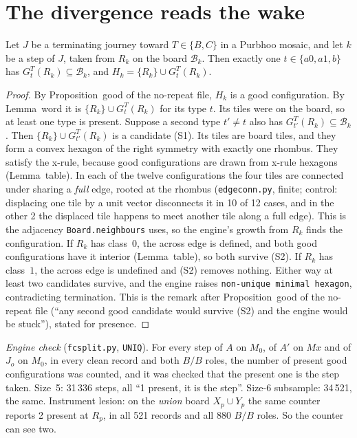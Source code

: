 \documentclass[11pt]{article}
\theoremstyle{definition}\newtheorem{definition}[theorem]{Definition}\newtheorem{remark}[theorem]{Remark}
\begin{document}
\section{The divergence reads the wake}\label{sec:fc}
\begin{lemma}\label{lem:U}
Let $J$ be a terminating journey toward $T\in\{B,C\}$ in a Purbhoo mosaic, and let $k$ be a step of $J$, taken from $R_k$ on the board $\mathcal B_k$. Then exactly one $t\in\{a0,a1,b\}$ has $G^T_t(R_k)\subseteq\mathcal B_k$, and $H_k=\{R_k\}\cup G^T_t(R_k)$.
\end{lemma}
\begin{proof}
By Proposition~good of the no-repeat file, $H_k$ is a good configuration. By Lemma~word it is $\{R_k\}\cup G^T_t(R_k)$ for its type $t$. Its tiles were on the board, so at least one type is present.
Suppose a second type $t'\ne t$ also has $G^T_{t'}(R_k)\subseteq\mathcal B_k$. Then $\{R_k\}\cup G^T_{t'}(R_k)$ is a candidate (S1). Its tiles are board tiles, and they form a convex hexagon of the right symmetry with exactly one rhombus. They satisfy the x-rule, because good configurations are drawn from x-rule hexagons (Lemma~table). In each of the twelve configurations the four tiles are connected under sharing a \emph{full} edge, rooted at the rhombus (\texttt{edgeconn.py}, finite; control: displacing one tile by a unit vector disconnects it in 10 of 12 cases, and in the other 2 the displaced tile happens to meet another tile along a full edge). This is the adjacency \texttt{Board.neighbours} uses, so the engine's growth from $R_k$ finds the configuration.
If $R_k$ has class~$0$, the across edge is defined, and both good configurations have it interior (Lemma~table), so both survive (S2). If $R_k$ has class~$1$, the across edge is undefined and (S2) removes nothing. Either way at least two candidates survive, and the engine raises \texttt{non-unique minimal hexagon}, contradicting termination. This is the remark after Proposition~good of the no-repeat file (``any second good candidate would survive (S2) and the engine would be stuck''), stated for presence.
\end{proof}
\noindent\emph{Engine check} (\texttt{fcsplit.py}, \texttt{UNIQ}). For every step of $A$ on $M_0$, of $A'$ on $Mx$ and of $J_o$ on $M_0$, in every clean record and both $B/B$ roles, the number of present good configurations was counted, and it was checked that the present one is the step taken. Size~5: 31\,336 steps, all ``1 present, it is the step''. Size-6 subsample: 34\,521, the same. Instrument lesion: on the \emph{union} board $X_p\cup Y_p$ the same counter reports 2 present at $R_p$, in all 521 records and all 880 $B/B$ roles. So the counter can see two.
\end{document}
